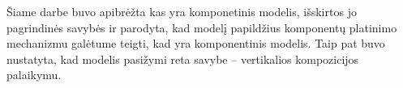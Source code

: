 
Šiame darbe buvo apibrėžta kas yra komponetinis modelis, išskirtos
jo pagrindinės savybės ir parodyta, kad  modelį
papildžius komponentų platinimo mechanizmu galėtume teigti, kad
 yra komponentinis modelis. Taip pat buvo nustatyta,
kad  modelis pasižymi reta savybe – vertikalios
kompozicijos palaikymu.
